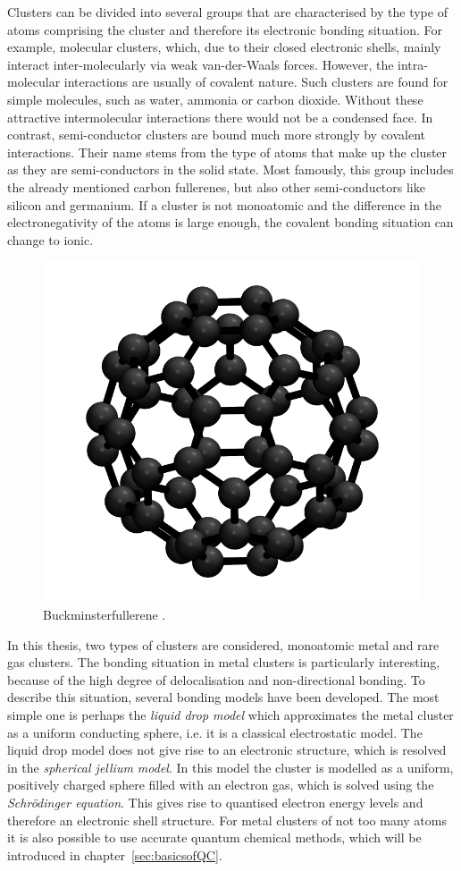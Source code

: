 Clusters can be divided into several groups that are characterised by the type
of atoms comprising the cluster and therefore its electronic bonding situation.
For example, molecular clusters, which, due to their closed electronic shells,
mainly interact inter-molecularly via weak van-der-Waals forces. However, the
intra-molecular interactions are usually of covalent nature. Such clusters are
found for simple molecules, such as water,\autocite{Liu_WaterClusters_1996}
ammonia\autocite{Beu_Structureammoniaclusters_2001} or carbon
dioxide.\autocite{Takeuchi_GeometryOptimizationCarbon_2008} 
Without these attractive intermolecular interactions there would not be
a condensed face. In contrast,
semi-conductor clusters are bound much more strongly by covalent interactions.
Their name stems from the type of atoms that make up the cluster as they are
semi-conductors in the solid state. Most famously, this group includes the
already mentioned carbon
fullerenes\autocite{Kroto_C60Buckminsterfullerene_1985}, but also other
semi-conductors like silicon\autocite{Zhu_Structuresstabilitiessmall_2003a} and
germanium.\autocite{Pacchioni_Silicongermaniumclusters_1986} If a cluster is not
monoatomic and the difference in the electronegativity of the atoms is large
enough, the covalent bonding situation can change to ionic.

\begin{figure}[htb]
    \centering
    \includegraphics[width=.5\textwidth]{golddual/C60Ih.png}
    \caption{Buckminsterfullerene .}
    \label{fig:C60example}
\end{figure}

In this thesis, two types of clusters are considered, monoatomic metal
and rare gas clusters. The bonding situation in metal clusters is particularly
interesting, because of the high degree of delocalisation and non-directional
bonding. To describe this situation, several bonding models have been developed.
The most simple one is perhaps the \emph{liquid drop model} which approximates
the metal cluster as a uniform conducting sphere, i.e. it is a classical
electrostatic model. The liquid drop model does not give rise to an electronic
structure, which is resolved in the \textit{spherical jellium model}. In this
model the cluster is modelled as a uniform, positively charged sphere filled
with an electron gas, which is solved using the \textit{Schr\"odinger equation}.
This gives rise to quantised electron energy levels and therefore an electronic
shell structure. For metal clusters of not too many atoms it is also possible to
use accurate quantum chemical methods, which will be introduced in
chapter~\ref{sec:basicsofQC}.

